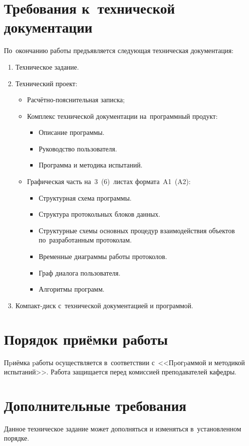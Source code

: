 \documentclass[a4paper,12pt]{article}
\begin{document}
\section{Требования к~технической документации}
По~окончанию работы предъявляется следующая техническая документация:
\begin{enumerate}
\item Техническое задание.
\item Технический проект:
\begin{itemize}
\item Расчётно-пояснительная записка;
\item Комплекс технической документации на~программный продукт:
\begin{itemize}
\item Описание программы.
\item Руководство пользователя.
\item Программа и методика испытаний.
\end{itemize}
\item Графическая часть на~3~(6)~листах формата~A1~(A2):
\begin{itemize}
\item Структурная схема программы.
\item Структура протокольных блоков данных.
\item Структурные схемы основных процедур взаимодействия объектов по~разработанным протоколам.
\item Временные диаграммы работы протоколов.
\item Граф диалога пользователя.
\item Алгоритмы программ.
\end{itemize}
\end{itemize}
\item Компакт-диск с~технической документацией и программой.
\end{enumerate}

\section{Порядок приёмки работы}
Пpиёмка pаботы осуществляется в~соответствии с~<<Пpогpаммой и методикой испытаний>>. Работа защищается перед комиссией преподавателей кафедры.

\section{Дополнительные требования}
Данное техническое задание может дополняться и изменяться в~установленном порядке.
\end{document}
